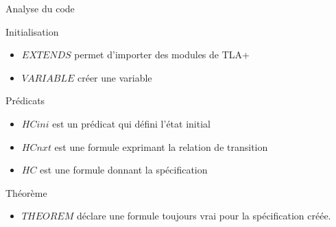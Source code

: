 \documentclass{beamer}
\begin{document}
\begin{frame}{Analyse du code}
	\begin{block}{Initialisation}
		\begin{itemize}
			\item $EXTENDS$ permet d'importer des modules de TLA+
			\item $VARIABLE$ créer une variable
		\end{itemize}	
	\end{block}		
	\begin{block}{Prédicats}
		\begin{itemize}
			\item $HCini$ est un prédicat qui défini l'état initial
			\item $HCnxt$ est une formule exprimant la relation de transition
			\item $HC$ est une formule donnant la spécification
		\end{itemize}	
	\end{block}
	\begin{block}{Théorème}
		\begin{itemize}
			\item $THEOREM$ déclare une formule toujours vrai pour la spécification créée.
		\end{itemize}	
	\end{block}			
\end{frame}
\end{document}
